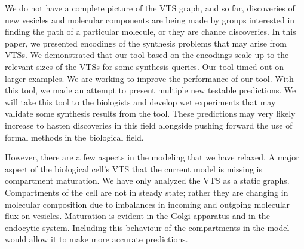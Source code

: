 \noindent 
%
We do not have a complete picture of the VTS graph, and so far, discoveries of new vesicles and molecular components are being made by groups interested in finding the path of a particular molecule, or they are chance discoveries. 
%
In this paper, we presented encodings of the synthesis problems
that may arise from VTSs.
%
%
We demonstrated that our tool based on the encodings
scale up to the relevant sizes of the VTSs for some synthesis queries.
%
Our tool timed out on larger examples.
%
We are working to improve the performance of our tool.
%
%
With this tool, we made an attempt to present multiple new testable predictions. 
%
We will take this tool to the biologists and develop wet experiments that may validate some synthesis results from the tool.
%
These predictions may very likely increase to hasten discoveries in this field alongside pushing forward the use of formal methods in the biological field.

%
However, there are a few aspects in the modeling that we have relaxed.
A major aspect of the biological cell’s VTS that the current model is missing is compartment maturation. 
%
We have only analyzed the VTS as a static graphs.
%
Compartments of the cell are not in steady state; rather they are changing in molecular composition due to imbalances in incoming and outgoing molecular flux on vesicles.
%
Maturation  is  evident  in  the  Golgi  apparatus  and  in  the  endocytic system. 
%
Including this behaviour of the compartments in the model would allow it to make more accurate predictions.
